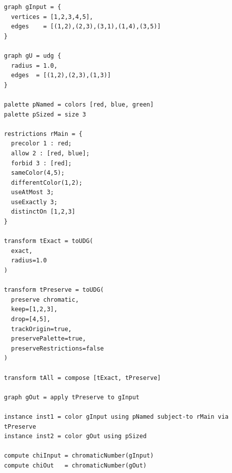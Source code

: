 \documentclass[11pt]{article}
\begin{document}
\begin{lstlisting}[style=plain]
graph gInput = {
  vertices = [1,2,3,4,5],
  edges    = [(1,2),(2,3),(3,1),(1,4),(3,5)]
}

graph gU = udg {
  radius = 1.0,
  edges  = [(1,2),(2,3),(1,3)]
}

palette pNamed = colors [red, blue, green]
palette pSized = size 3

restrictions rMain = {
  precolor 1 : red;
  allow 2 : [red, blue];
  forbid 3 : [red];
  sameColor(4,5);
  differentColor(1,2);
  useAtMost 3;
  useExactly 3;
  distinctOn [1,2,3]
}

transform tExact = toUDG(
  exact,
  radius=1.0
)

transform tPreserve = toUDG(
  preserve chromatic,
  keep=[1,2,3],
  drop=[4,5],
  trackOrigin=true,
  preservePalette=true,
  preserveRestrictions=false
)

transform tAll = compose [tExact, tPreserve]

graph gOut = apply tPreserve to gInput

instance inst1 = color gInput using pNamed subject-to rMain via tPreserve
instance inst2 = color gOut using pSized

compute chiInput = chromaticNumber(gInput)
compute chiOut   = chromaticNumber(gOut)
\end{lstlisting}
\end{document}
